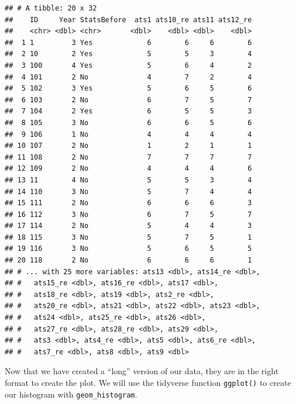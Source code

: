 \documentclass[12pt,]{book}
\newenvironment{Shaded}{\begin{snugshade}}{\end{snugshade}}
\newcommand{\DataTypeTok}[1]{\textcolor[rgb]{0.13,0.29,0.53}{#1}}
\newcommand{\DecValTok}[1]{\textcolor[rgb]{0.00,0.00,0.81}{#1}}
\newcommand{\FloatTok}[1]{\textcolor[rgb]{0.00,0.00,0.81}{#1}}
\newcommand{\KeywordTok}[1]{\textcolor[rgb]{0.13,0.29,0.53}{\textbf{#1}}}
\newcommand{\NormalTok}[1]{#1}
\newcommand{\OperatorTok}[1]{\textcolor[rgb]{0.81,0.36,0.00}{\textbf{#1}}}
\newcommand{\StringTok}[1]{\textcolor[rgb]{0.31,0.60,0.02}{#1}}
\begin{document}
\begin{verbatim}
## # A tibble: 20 x 32
##    ID     Year StatsBefore  ats1 ats10_re ats11 ats12_re
##    <chr> <dbl> <chr>       <dbl>    <dbl> <dbl>    <dbl>
##  1 1         3 Yes             6        6     6        6
##  2 10        2 Yes             5        5     3        4
##  3 100       4 Yes             5        6     4        2
##  4 101       2 No              4        7     2        4
##  5 102       3 Yes             5        6     5        6
##  6 103       2 No              6        7     5        7
##  7 104       2 Yes             6        5     5        3
##  8 105       3 No              6        6     5        6
##  9 106       1 No              4        4     4        4
## 10 107       2 No              1        2     1        1
## 11 108       2 No              7        7     7        7
## 12 109       2 No              4        4     4        6
## 13 11        4 No              5        5     3        4
## 14 110       3 No              5        7     4        4
## 15 111       2 No              6        6     6        3
## 16 112       3 No              6        7     5        7
## 17 114       2 No              5        4     4        3
## 18 115       3 No              5        7     5        1
## 19 116       3 No              5        6     5        5
## 20 118       2 No              6        6     6        1
## # ... with 25 more variables: ats13 <dbl>, ats14_re <dbl>,
## #   ats15_re <dbl>, ats16_re <dbl>, ats17 <dbl>,
## #   ats18_re <dbl>, ats19 <dbl>, ats2_re <dbl>,
## #   ats20_re <dbl>, ats21 <dbl>, ats22 <dbl>, ats23 <dbl>,
## #   ats24 <dbl>, ats25_re <dbl>, ats26 <dbl>,
## #   ats27_re <dbl>, ats28_re <dbl>, ats29 <dbl>,
## #   ats3 <dbl>, ats4_re <dbl>, ats5 <dbl>, ats6_re <dbl>,
## #   ats7_re <dbl>, ats8 <dbl>, ats9 <dbl>
\end{verbatim}

Now that we have created a ``long'' version of our data, they are in the right format to create the plot. We will use the tidyverse function \texttt{ggplot()} to create our histogram with \texttt{geom\_histogram}.

\begin{Shaded}
\end{Shaded}
\end{document}
